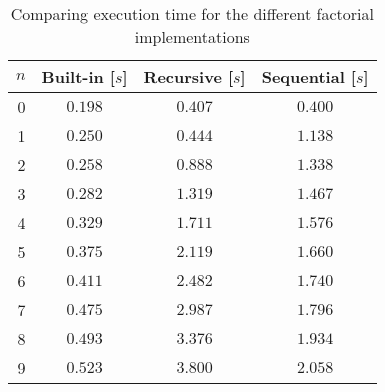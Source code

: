 \begin{table}[htp]
	\begin{center}
	\caption{Comparing execution time for
the different factorial implementations}
	\label{tab:facT}
		\begin{tabular}{rccc}
		\toprule
			{$n$} & {Built-in [$s$]} & {Recursive [$s$]} & {Sequential [$s$]}\\
			\midrule
			{0} & $0.198$ & $0.407$ & $0.400$\\
			{1} & $0.250$ & $0.444$ & $1.138$\\
			{2} & $0.258$ & $0.888$ & $1.338$\\
			{3} & $0.282$ & $1.319$ & $1.467$\\
			{4} & $0.329$ & $1.711$ & $1.576$\\
			{5} & $0.375$ & $2.119$ & $1.660$\\
			{6} & $0.411$ & $2.482$ & $1.740$\\
			{7} & $0.475$ & $2.987$ & $1.796$\\
			{8} & $0.493$ & $3.376$ & $1.934$\\
			{9} & $0.523$ & $3.800$ & $2.058$\\
		\bottomrule
		\end{tabular}
	\end{center}
\end{table}